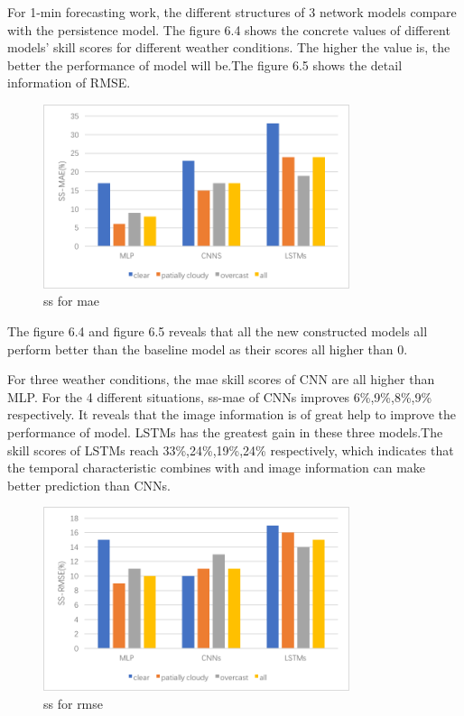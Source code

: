 For 1-min forecasting work, the different structures of 3 network models compare with the persistence model. The figure 6.4 shows the concrete values of different models' skill scores for different weather conditions. The higher the value is, the better the performance of model will be.The figure 6.5 shows the detail information of RMSE.

\begin{figure}[!ht]
	\centering
	\includegraphics[width=0.8\textwidth]{ssmae.png}
	\caption{ss for mae\label{fig:lstm}}
\end{figure}






The figure 6.4 and figure 6.5 reveals that all the new constructed models all perform better than the baseline model as their scores all higher than 0.

For three weather conditions, the mae skill scores of CNN are all higher than MLP. For the 4 different situations, ss-mae of CNNs improves 6\%,9\%,8\%,9\% respectively.
It reveals that the image information is of great help to improve the performance of model.
LSTMs has the greatest gain in these three models.The skill scores of LSTMs reach 33\%,24\%,19\%,24\% respectively, which indicates that the  temporal characteristic combines with and image information can make better prediction than CNNs.




\begin{figure}[!ht]
	\centering
	\includegraphics[width=0.8\textwidth]{ssrmse.png}
	\caption{ss for rmse\label{fig:lstm}}
\end{figure}


